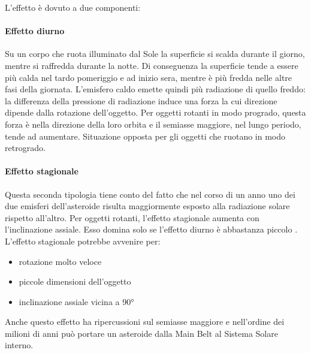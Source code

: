 \documentclass[a4paper,11pt,openright]{book}
\begin{document}
L’effetto è dovuto a due componenti:

\paragraph*{Effetto diurno}
Su un corpo che ruota illuminato dal Sole la superficie si scalda durante il giorno, mentre si raffredda durante la notte. Di conseguenza la superficie tende a essere più calda nel tardo pomeriggio e ad inizio sera, mentre è più fredda nelle altre fasi della giornata. L’emisfero caldo emette quindi più radiazione di quello freddo: la differenza della pressione di radiazione induce una forza la cui direzione dipende dalla rotazione dell’oggetto. Per oggetti rotanti in modo progrado, questa forza è nella direzione della loro orbita e il semiasse maggiore, nel lungo periodo, tende ad aumentare. Situazione opposta per gli oggetti che ruotano in modo retrogrado.

\paragraph*{Effetto stagionale}
Questa seconda tipologia tiene conto del fatto che nel corso di un anno uno dei due emisferi dell’asteroide risulta maggiormente esposto alla radiazione solare rispetto all’altro. Per oggetti rotanti, l’effetto stagionale aumenta con l’inclinazione assiale. Esso domina solo se l’effetto diurno è abbastanza piccolo \citep{Vokrouhlicky_1999}.
L’effetto stagionale potrebbe avvenire per:

\begin{itemize}
    \item rotazione molto veloce
    \item piccole dimensioni dell’oggetto
    \item inclinazione assiale vicina a 90°
\end{itemize}

Anche questo effetto ha ripercussioni sul semiasse maggiore e nell'ordine dei milioni di anni può portare un asteroide dalla Main Belt al Sistema Solare interno.
\end{document}
